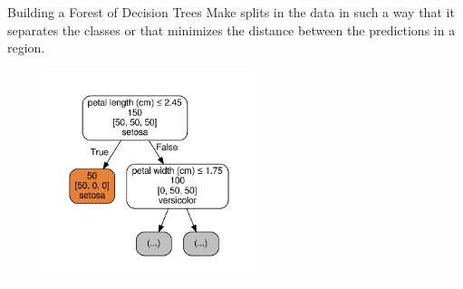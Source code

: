 \documentclass[10pt]{beamer}
\begin{document}
\begin{frame}{Building a Forest of Decision Trees}
Make splits in the data in such a way that it separates the classes or that minimizes the distance between the predictions in a region.
		\begin{figure}	
			\includegraphics[width=0.55\textwidth, center, trim=0cm 0cm 0 0cm]{images/DT_2_simple.pdf}
	\end{figure}
\end{frame}
\end{document}
